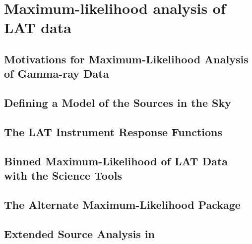 \chapter{Maximum-likelihood analysis of LAT data}



\section{Motivations for Maximum-Likelihood Analysis of Gamma-ray Data}


\section{Defining a Model of the Sources in the Sky}


\section{The LAT Instrument Response Functions}


\section{Binned Maximum-Likelihood of LAT Data with the Science Tools}



\section{The Alternate Maximum-Likelihood Package \pointlike}


\section{Extended Source Analysis in \pointlike}
